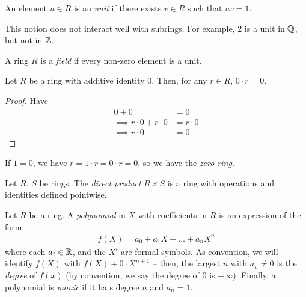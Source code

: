 \documentclass{../template/note}
\begin{document}
    \begin{definition}[Units]
        An element $u \in R$ is an \emph{unit} if there exists $v \in R$ such that $uv = 1$.
    \end{definition}
    
    \begin{remark*}
        This notion does not interact well with subrings. For example, 2 is a unit in $\mathbb Q$, but not in $\mathbb Z$.
    \end{remark*}
    
    \begin{definition}[Field]
        A ring $R$ is a \emph{field} if every non-zero element is a unit.
    \end{definition}
    
    \begin{proposition} 
        Let $R$ be a ring with additive identity $0$. Then, for any $r \in R$, $0 \cdot r = 0$.
    \end{proposition}
    
    \begin{proof}
        Have
        \begin{align*}
            0 + 0 &= 0 \\
            \implies r \cdot 0 + r \cdot 0 &= r \cdot 0 \\
            \implies r \cdot 0 &= 0
        \end{align*}
    \end{proof}
    
    \begin{remark*}
        If $1 = 0$, we have $r = 1 \cdot r = 0 \cdot r = 0$, so we have the \emph{zero ring}.
    \end{remark*}

    \begin{definition}
        Let $R$, $S$ be rings. The \emph{direct product} $R \times S$ is a ring with operations and identities defined pointwise.
    \end{definition}
    
    \begin{definition}[Polynomials]
        Let $R$ be a ring. A \emph{polynomial} in $X$ with coefficients in $R$ is an expression of the form
        \begin{align*}
            f(X) = a_0 + a_1X + \dots + a_nX^n
        \end{align*}
        where each $a_i \in \mathbb R$, and the $X^i$ are formal symbols.  As convention, we will identify $f(X)$ with $f(X) + 0 \cdot X^{n+1}$ -- then, the largest $n$ with $a_n \neq 0$ is the \emph{degree} of $f(x)$ (by convention, we say the degree of $0$ is $-\infty$). Finally, a polynomial is \emph{monic} if it ha s degree $n$ and $a_n=1$.
    \end{definition}
    
\end{document}
